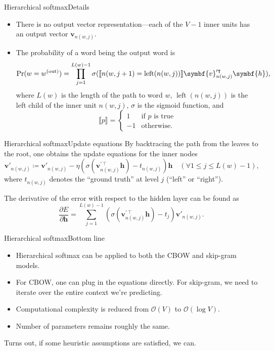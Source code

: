 \documentclass[serif, xcolor={svgnames, table}, usepdftitle=false]{beamer}
\renewcommand*{\vec}{\symbf}
\begin{document}
\begin{frame}{Hierarchical softmax}{Details}
  \begin{itemize}
  \item There is no output vector representation---each of the \(V - 1\) inner
    units has an output vector \(\vec{v}_{n(w, j)}\).
  \item The probability of a word being the output word is
    \[
      \Pr(w = \wo) = \prod\limits_{j = 1}^{L(w) - 1} \sigma(\llbracket n(w, j +
      1) = \operatorname{left}(n(w, j))\rrbracket
      \vec{v}^{\prime\intercal}_{n(w, j)} \vec{h})\text{,}
    \]
    where \(L(w)\) is the length of the path to word \(w\),
    \(\operatorname{left}(n(w, j))\) is the left child of the inner unit
    \(n(w, j)\), \(\sigma\) is the sigmoid function, and
    \[
      \llbracket p \rrbracket =
      \begin{cases}
        1 & \text{if }p\text{ is true}\\
        -1 & \text{otherwise.}
      \end{cases}
    \]
  \end{itemize}
\end{frame}

\begin{frame}{Hierarchical softmax}{Update equations}
  By backtracing the path from the leaves to the root, one obtains the update
  equations for the inner nodes
  \[
    \vec{v}'_{n(w, j)} \coloneqq \vec{v}'_{n(w, j)} - \eta \left(
      \sigma(\vec{v}^{\prime\intercal}_{n(w, j)} \vec{h}) - t_{n(w, j)} \right)
    \vec{h} \quad (\forall 1 \le j \le L(w) - 1)\text{,}
  \]
  where \(t_{n(w, j)}\) denotes the ``ground truth'' at level \(j\) (``left'' or
  ``right'').

  The derivative of the error with respect to the hidden layer can be found as
  \[
    \frac{\partial E}{\partial \vec{h}} = \sum\limits_{j = 1}^{L(w) - 1}
    \left(\sigma(\vec{v}^{\prime\intercal}_{n(w, j)} \vec{h}) - t_j\right)
    \vec{v}'_{n(w, j)}\text{.}
  \]
\end{frame}

\begin{frame}{Hierarchical softmax}{Bottom line}
  \begin{itemize}
  \item Hierarchical softmax can be applied to both the CBOW and skip-gram
    models.
  \item For CBOW, one can plug in the equations directly.  For skip-gram, we
    need to iterate over the entire context we're predicting.
  \item Computational complexity is reduced from \(\mathcal{O}(V)\) to
    \(\mathcal{O}(\log V)\).
  \item Number of parameters remains roughly the same.
  \end{itemize}

    Turns out, if some heuristic assumptions
  are satisfied, we can.
\end{frame}
\end{document}
